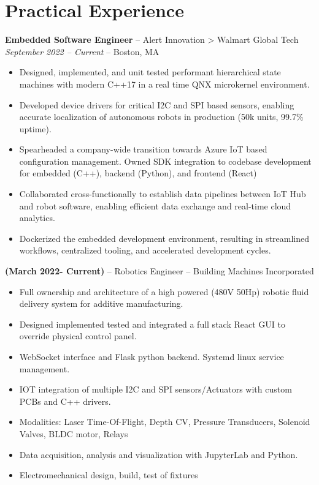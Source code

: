 \documentclass[11pt,a4paper]{article}
\newcommand{\jobentry}[2]{
  \textbf{#1} -- #2\\
}
\newcommand{\divider}{\vspace{6pt}}
\newcommand{\cvevent}[4]{
  \textbf{#1} -- #2\\
  \textit{#3} -- #4\\
}
\begin{document}
\section*{Practical Experience}

\cvevent{Embedded Software Engineer}{Alert Innovation > Walmart Global Tech}{September 2022 -- Current}{Boston, MA}
\begin{itemize}
\item Designed, implemented, and unit tested performant hierarchical state machines with modern C++17 in a real time QNX microkernel environment. 
\item Developed device drivers for critical I2C and SPI based sensors, enabling accurate localization of autonomous robots in production (50k units, 99.7\% uptime).                                                        
\item Spearheaded a company-wide transition towards Azure IoT based configuration management. Owned SDK integration to codebase development for embedded (C++), backend (Python), and frontend (React)                                              
\item Collaborated cross-functionally to establish data pipelines between IoT Hub and robot software, enabling efficient data exchange and real-time cloud analytics.                       
\item Dockerized the embedded development environment, resulting in streamlined workflows, centralized tooling, and accelerated development cycles.
\end{itemize}
\divider

\jobentry{(March 2022- Current)}{Robotics Engineer -- Building Machines Incorporated}
\begin{itemize}
\item Full ownership and architecture of a high powered (480V 50Hp) robotic fluid delivery system for additive manufacturing.
\item Designed implemented tested and integrated a full stack React GUI to override physical control panel.
\item WebSocket interface and Flask python backend. Systemd linux service management.
\item IOT integration of multiple I2C and SPI sensors/Actuators with custom PCBs and C++ drivers.
\item Modalities: Laser Time-Of-Flight, Depth CV, Pressure Transducers, Solenoid Valves, BLDC motor, Relays
\item Data acquisition, analysis and visualization with JupyterLab and Python.
\item Electromechanical design, build, test of fixtures
\end{itemize}
\end{document}

